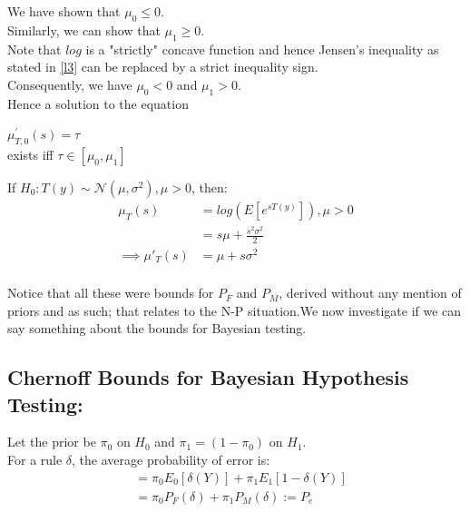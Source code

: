 \documentclass[12pt]{report}
\begin{document}
\noindent We have shown that  $\mu_0 \leq 0$.\\
\noindent Similarly, we can show that $\mu_1 \geq 0$.\\

\noindent Note that $log$ is a "strictly" concave function and hence Jensen's  inequality as stated in  \ref{l3} can be replaced by a strict inequality sign.\\
                Consequently, we have  $\mu_0 < 0$ and  $\mu_1 > 0$. \\

\noindent Hence a solution to the equation \\

              \begin{center}
                  $ \mu^\prime_{T,0}(s) = \tau$\\
                 exists iff  $ \tau \in [\mu_0, \mu_1]$\\
              \end{center}


\begin{exmp}
         If $H_0: T(y) \sim \mathcal{N}(\mu,\sigma^{2}), \mu > 0 $,  then:
                  \begin{align*}
                         \mu_{T}(s)&=log(E[e^{sT(y)}]), \mu > 0\\
                                           &=s\mu + \frac{s^{2}\sigma ^{2}}{2}\\
                          \implies \mu \prime_{T}(s) &= \mu + s\sigma^{2}\\
                  \end{align*}
\end{exmp}




\noindent Notice that all these were bounds for $P_F$ and  $P_M$, derived without any mention of priors and as such; that relates to the N-P situation.We now investigate if we can say something about the bounds for Bayesian testing.

\subsection{Chernoff Bounds for Bayesian Hypothesis Testing:}

\par Let the prior be $\pi_0$ on $H_0$ and $\pi_1 = (1 - \pi_0 )$  on $ H_1 $.\\

\noindent For a rule $\delta$, the average probability of error  is:
              \begin{align}
                   &= \pi_0  E_0[\delta(Y)] + \pi_1  E_1[1- \delta(Y)]\nonumber\\
                   &= \pi_0  P_F(\delta) + \pi_1  P_M(\delta) 
                     := P_e
               \end{align}
\end{document}
